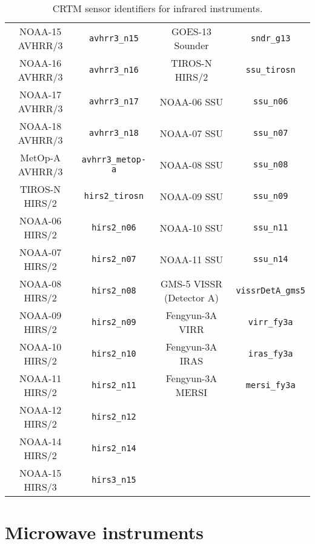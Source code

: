 \begin{table}[htp]
\begin{tabular}{|c|c||c|c|}
NOAA-15 AVHRR/3 & \texttt{avhrr3\_n15}             & GOES-13 Sounder & \texttt{sndr\_g13}                      \\
NOAA-16 AVHRR/3 & \texttt{avhrr3\_n16}             & TIROS-N HIRS/2  & \texttt{ssu\_tirosn}                    \\
NOAA-17 AVHRR/3 & \texttt{avhrr3\_n17}             & NOAA-06 SSU & \texttt{ssu\_n06}                           \\
NOAA-18 AVHRR/3 & \texttt{avhrr3\_n18}             & NOAA-07 SSU & \texttt{ssu\_n07}                           \\
MetOp-A AVHRR/3 & \texttt{avhrr3\_metop-a}         & NOAA-08 SSU & \texttt{ssu\_n08}                           \\
TIROS-N HIRS/2 & \texttt{hirs2\_tirosn}            & NOAA-09 SSU & \texttt{ssu\_n09}                           \\
NOAA-06 HIRS/2 & \texttt{hirs2\_n06}               & NOAA-10 SSU & \texttt{ssu\_n11}                           \\
NOAA-07 HIRS/2 & \texttt{hirs2\_n07}               & NOAA-11 SSU & \texttt{ssu\_n14}                           \\
NOAA-08 HIRS/2 & \texttt{hirs2\_n08}               & GMS-5 VISSR (Detector A) & \texttt{vissrDetA\_gms5}       \\
NOAA-09 HIRS/2 & \texttt{hirs2\_n09}               & Fengyun-3A VIRR  & \texttt{virr\_fy3a}  \\
NOAA-10 HIRS/2 & \texttt{hirs2\_n10}               & Fengyun-3A IRAS  & \texttt{iras\_fy3a}  \\
NOAA-11 HIRS/2 & \texttt{hirs2\_n11}               & Fengyun-3A MERSI & \texttt{mersi\_fy3a} \\
NOAA-12 HIRS/2 & \texttt{hirs2\_n12}               & & \\
NOAA-14 HIRS/2 & \texttt{hirs2\_n14}               & & \\
NOAA-15 HIRS/3 & \texttt{hirs3\_n15}               & & \\
    \hline
  \end{tabular}
  \caption{CRTM sensor identifiers for infrared instruments.}
  \label{tab:ir_sensor_id}
\end{table}


\section{Microwave instruments}

